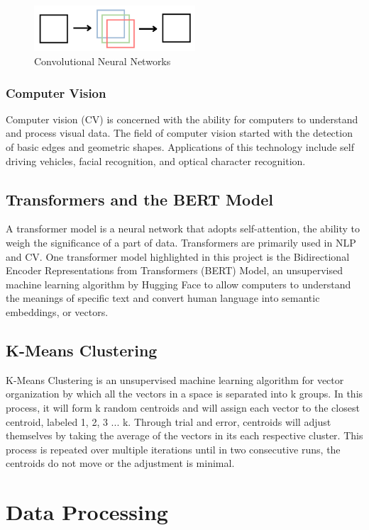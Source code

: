 \documentclass[11pt, a4paper, twocolumn]{article}
\begin{document}
\begin{figure}[htp]
    \centering
    \includegraphics[width=6cm]{cnn.png}
    \caption{Convolutional Neural Networks}
    \label{fig:cnn}
\end{figure}

\subsubsection{Computer Vision}
Computer vision (CV) is concerned with the ability for computers to understand and process visual data. The field of computer vision started with the detection of basic edges and geometric shapes.  Applications of this technology include self driving vehicles, facial recognition, and optical character recognition. 

\subsection{Transformers and the BERT Model}
A transformer model is a neural network that adopts self-attention, the ability to weigh the significance of a part of data. Transformers are primarily used in NLP and CV. One transformer model highlighted in this project is the Bidirectional Encoder Representations from Transformers (BERT) Model, an unsupervised machine learning algorithm by Hugging Face to allow computers to understand the meanings of specific text and convert human language into semantic embeddings, or vectors.

\subsection{K-Means Clustering}
K-Means Clustering is an unsupervised machine learning algorithm for vector organization by which all the vectors in a space is separated into {k} groups. In this process, it will form {k} random centroids and will assign each vector to the closest centroid, labeled 1, 2, 3 ... {k}. Through trial and error, centroids will adjust themselves by taking the average of the vectors in its each respective cluster. This process is repeated over multiple iterations until in two consecutive runs, the centroids do not move or the adjustment is minimal. 

\section{\Large{Data Processing}}
\end{document}
